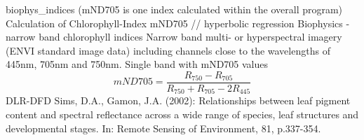 %
{ %
biophys\_indices (mND705 is one index calculated within the overall program)
}
%
{ %
Calculation of Chlorophyll-Index mND705 // hyperbolic regression
}
%
{ %
Biophysics - narrow band chlorophyll indices
}
%
{ %
Narrow band multi- or hyperspectral imagery (ENVI standard image data) including channels close to the wavelengths of 445nm, 705nm and 750nm.\bigskip
}
%
{ %
Single band with mND705 values
}
%
{ %
\begin{displaymath}
mND705 = \frac{R_{750} - R_{705}}{R_{750}+R_{705} - 2R_{445}}
\end{displaymath}
}
%
{ %
DLR-DFD
}
%
{ %
Sims, D.A., Gamon, J.A. (2002): Relationships between leaf pigment content and spectral reflectance across a wide range of species, leaf structures and developmental stages. In: Remote Sensing of Environment, 81, p.337-354.
}
